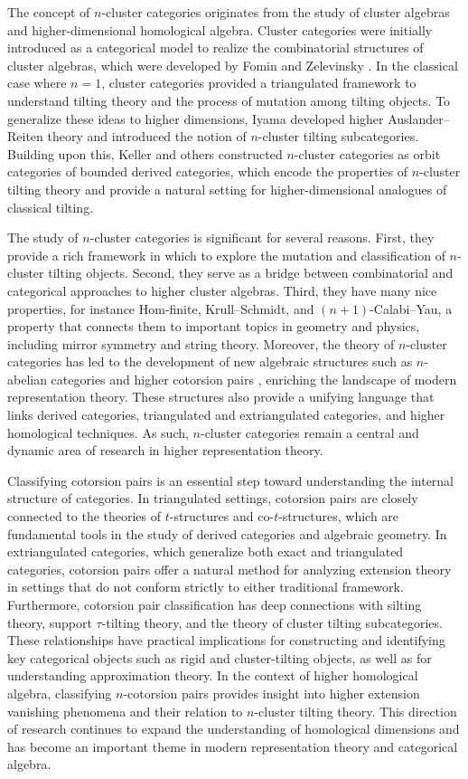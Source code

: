 \documentclass[a4paper,reqno,11pt]{amsart}
\theoremstyle{definition}
\begin{document}
The concept of $n$-cluster categories originates from the study of cluster algebras and higher-dimensional homological algebra. Cluster categories were initially introduced as a categorical model to realize the combinatorial structures of cluster algebras, which were developed by Fomin and Zelevinsky \cite{FZ}. In the classical case where $n=1$, cluster categories provided a triangulated framework to understand tilting theory and the process of mutation among tilting objects.
To generalize these ideas to higher dimensions, Iyama \cite{I} developed higher Auslander--Reiten theory and introduced the notion of $n$-cluster tilting subcategories. Building upon this, Keller and others \cite{K,BM,BM1,Ja}constructed $n$-cluster categories as orbit categories of bounded derived categories, which encode the properties of $n$-cluster tilting theory and provide a natural setting for higher-dimensional analogues of classical tilting.

The study of $n$-cluster categories is significant for several reasons. First, they provide a rich framework in which to explore the mutation and classification of $n$-cluster tilting objects. Second, they serve as a bridge between combinatorial and categorical approaches to higher cluster algebras. Third, they have many nice properties, for instance Hom-finite, Krull–Schmidt, and $(n+1)$-Calabi--Yau, a property that connects them to important topics in geometry and physics, including mirror symmetry and string theory.
Moreover, the theory of $n$-cluster categories has led to the development of new algebraic structures such as $n$-abelian categories \cite{G} and higher cotorsion pairs \cite{HMP,HZ,CZ}, enriching the landscape of modern representation theory. These structures also provide a unifying language that links derived categories, triangulated and extriangulated categories, and higher homological techniques. As such, $n$-cluster categories remain a central and dynamic area of research in higher representation theory.

Classifying cotorsion pairs is an essential step toward understanding the internal structure of categories. In triangulated settings, cotorsion pairs are closely connected to the theories of $t$-structures and co-$t$-structures, which are fundamental tools in the study of derived categories and algebraic geometry. In extriangulated categories, which generalize both exact and triangulated categories, cotorsion pairs offer a natural method for analyzing extension theory in settings that do not conform strictly to either traditional framework.
Furthermore, cotorsion pair classification has deep connections with silting theory, support $\tau$-tilting theory, and the theory of cluster tilting subcategories. These relationships have practical implications for constructing and identifying key categorical objects such as rigid and cluster-tilting objects, as well as for understanding approximation theory.
In the context of higher homological algebra, classifying $n$-cotorsion pairs provides insight into higher extension vanishing phenomena and their relation to $n$-cluster tilting theory. This direction of research continues to expand the understanding of homological dimensions and has become an important theme in modern representation theory and categorical algebra.
\end{document}
